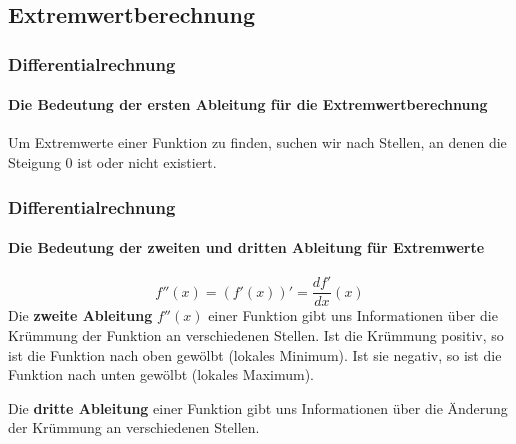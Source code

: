\documentclass{beamer}
\begin{document}
\subsection{Extremwertberechnung}
\begin{frame}
  \frametitle{Differentialrechnung}
  \framesubtitle{Die Bedeutung der ersten Ableitung für die Extremwertberechnung}

Um Extremwerte einer Funktion zu finden, suchen wir nach Stellen, an denen die Steigung $0$ ist oder nicht existiert.
 
  
  
\end{frame}

\begin{frame}
  \frametitle{Differentialrechnung}
  \framesubtitle{Die Bedeutung der zweiten und dritten Ableitung für Extremwerte}
  $$f''(x) = (f'(x))'=\frac{d f'}{dx}(x)$$
  Die \textbf{zweite Ableitung} $f''(x)$ einer Funktion gibt uns Informationen über die Krümmung der Funktion an verschiedenen Stellen. Ist die Krümmung positiv, so ist die Funktion nach oben gewölbt (lokales Minimum). Ist sie negativ, so ist die Funktion nach unten gewölbt (lokales Maximum).

  \vspace{1em}

  Die \textbf{dritte Ableitung} einer Funktion gibt uns Informationen über die Änderung der Krümmung an verschiedenen Stellen.  
\end{frame}
\end{document}
